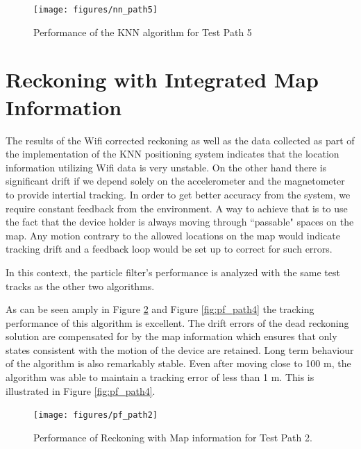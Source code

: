 \begin{figure}
    \centering
    \texttt{[image: figures/nn\_path5]}
    \caption{Performance of the KNN algorithm for Test Path 5\label{fig:nn_path5}}
\end{figure}



\section{Reckoning with Integrated Map Information}

The results of the Wifi corrected reckoning as well as the data collected 
as part of the implementation of the KNN positioning system indicates that 
the location information utilizing Wifi data is very unstable. On the other
hand there is significant drift if we depend solely on the accelerometer
and the magnetometer to provide intertial tracking. In order to get 
better accuracy from the system, we require constant feedback from the 
environment. A way to achieve that is to use the fact that the device 
holder is always moving through ``passable" spaces on the map. Any motion
contrary to the allowed locations on the map would indicate tracking drift 
and a feedback loop would be set up to correct for such errors.

In this context, the particle filter's performance is analyzed with the
same test tracks as the other two algorithms. 

As can be seen amply in Figure \ref{fig:pf_path2} and Figure \ref{fig:pf_path4}
the tracking performance of this algorithm is excellent. The drift errors of the 
dead reckoning solution are compensated for by the map information
which ensures that only states consistent with the motion of the device 
are retained. Long term behaviour of the algorithm is also remarkably 
stable. Even after moving close to 100 m, the algorithm was able to 
maintain a tracking error of less than 1 m. This is illustrated in 
Figure \ref{fig:pf_path4}.


\begin{figure}
    \centering
    \texttt{[image: figures/pf\_path2]}
    \caption{Performance of Reckoning with Map information for Test Path 2.\label{fig:pf_path2}}
\end{figure}

